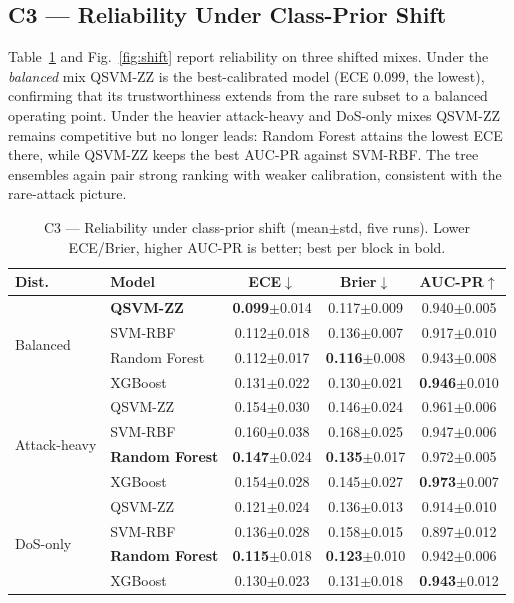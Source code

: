 \documentclass[journal]{IEEEtran}
\newcommand{\ZZ}{\textsc{ZZ}}
\newcommand{\QSVM}{QSVM-\ZZ}
\begin{document}
\subsection{C3 --- Reliability Under Class-Prior Shift}
Table~\ref{tab:shift} and Fig.~\ref{fig:shift} report reliability on
three shifted mixes. Under the \emph{balanced} mix \QSVM{} is the
best-calibrated model (ECE $0.099$, the lowest), confirming that its
trustworthiness extends from the rare subset to a balanced operating
point. Under the heavier attack-heavy and DoS-only mixes \QSVM{} remains
competitive but no longer leads: Random Forest attains the lowest ECE
there, while \QSVM{} keeps the best AUC-PR against SVM-RBF. The tree
ensembles again pair strong ranking with weaker calibration, consistent
with the rare-attack picture.

\begin{table}[t]
\centering
\caption{C3 --- Reliability under class-prior shift (mean$\pm$std, five
  runs). Lower ECE/Brier, higher AUC-PR is better; best per block in bold.}
\label{tab:shift}
\small
\begin{tabular}{llccc}
\toprule
Dist. & Model & ECE$\downarrow$ & Brier$\downarrow$ & AUC-PR$\uparrow$\\\midrule
\multirow{4}{*}{Balanced}
 & \textbf{\QSVM{}} & \textbf{0.099}$\pm$0.014 & 0.117$\pm$0.009 & 0.940$\pm$0.005\\
 & SVM-RBF       & 0.112$\pm$0.018 & 0.136$\pm$0.007 & 0.917$\pm$0.010\\
 & Random Forest & 0.112$\pm$0.017 & \textbf{0.116}$\pm$0.008 & 0.943$\pm$0.008\\
 & XGBoost       & 0.131$\pm$0.022 & 0.130$\pm$0.021 & \textbf{0.946}$\pm$0.010\\\midrule
\multirow{4}{*}{Attack-heavy}
 & \QSVM{}       & 0.154$\pm$0.030 & 0.146$\pm$0.024 & 0.961$\pm$0.006\\
 & SVM-RBF       & 0.160$\pm$0.038 & 0.168$\pm$0.025 & 0.947$\pm$0.006\\
 & \textbf{Random Forest} & \textbf{0.147}$\pm$0.024 & \textbf{0.135}$\pm$0.017 & 0.972$\pm$0.005\\
 & XGBoost       & 0.154$\pm$0.028 & 0.145$\pm$0.027 & \textbf{0.973}$\pm$0.007\\\midrule
\multirow{4}{*}{DoS-only}
 & \QSVM{}       & 0.121$\pm$0.024 & 0.136$\pm$0.013 & 0.914$\pm$0.010\\
 & SVM-RBF       & 0.136$\pm$0.028 & 0.158$\pm$0.015 & 0.897$\pm$0.012\\
 & \textbf{Random Forest} & \textbf{0.115}$\pm$0.018 & \textbf{0.123}$\pm$0.010 & 0.942$\pm$0.006\\
 & XGBoost       & 0.130$\pm$0.023 & 0.131$\pm$0.018 & \textbf{0.943}$\pm$0.012\\
\bottomrule
\end{tabular}
\end{table}
\end{document}

